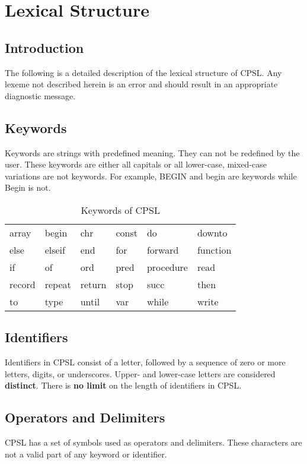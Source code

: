 \documentclass{book}
\begin{document}
\chapter{Lexical Structure}
\section{Introduction}
The following is a detailed description of the lexical structure of CPSL.
Any lexeme not described herein is an error and should result in an appropriate diagnostic message.
\section{Keywords}
Keywords are strings with predefined meaning.  
They can not be redefined by the user.
These keywords are either all capitals or all lower-case, 
mixed-case variations are not keywords.
For example, BEGIN and begin are keywords while Begin is not.

\begin{table}[h!]
\begin{center}
\begin{tabular}{llllll}
array & begin & chr & const & do & downto \\
else & elseif & end & for & forward & function \\
if & of & ord & pred & procedure & read \\
record & repeat & return & stop & succ & then \\
to & type & until & var & while & write \\
\end{tabular}
\end{center}
\caption{Keywords of CPSL}
\end{table}
\section{Identifiers}
Identifiers in CPSL consist of a letter, followed by a sequence of zero or more letters, digits, or underscores.
Upper- and lower-case letters are considered \textbf{distinct}.
There is \textbf{no limit} on the length of identifiers in CPSL.

\section{Operators and Delimiters}
CPSL has a set of symbols used as operators and delimiters.
These characters are not a valid part of any keyword or identifier.
\end{document}
